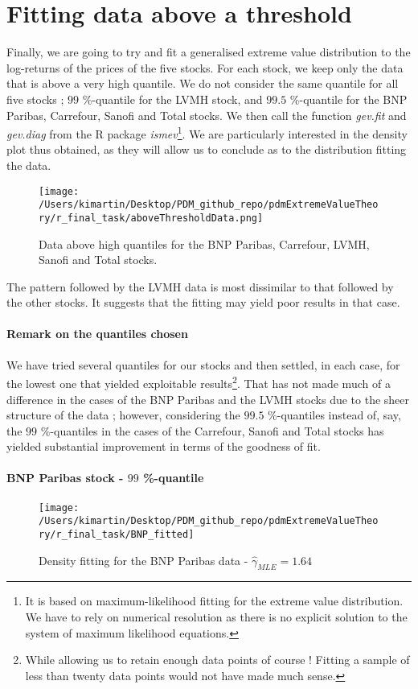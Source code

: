 \section{Fitting data above a threshold}
Finally, we are going to try and fit a generalised extreme value distribution to the log-returns of the prices of the five stocks. For each stock, we keep only the data that is above a very high quantile. We do not consider the same quantile for all five stocks ; $99$ \%-quantile for the LVMH stock, and $99.5$ \%-quantile for the BNP Paribas, Carrefour, Sanofi and Total stocks. We then call the function \textit{gev.fit} and \textit{gev.diag} from the R package \textit{ismev}\footnote{It is based on maximum-likelihood fitting for the extreme value distribution. We have to rely on numerical resolution as there is no explicit solution to the system of maximum likelihood equations.}. We are particularly interested in the density plot thus obtained, as they will allow us to conclude as to the distribution fitting the data.
\begin{figure}[h!]
	\centering
	\texttt{[image: /Users/kimartin/Desktop/PDM\_github\_repo/pdmExtremeValueTheory/r\_final\_task/aboveThresholdData.png]}
	\caption{Data above high quantiles for the BNP Paribas, Carrefour, LVMH, Sanofi and Total stocks.}
	\label{fig:dataAboveThreshold}
\end{figure}
The pattern followed by the LVMH data is most dissimilar to that followed by the other stocks. It suggests that the fitting may yield poor results in that case.
\paragraph{Remark on the quantiles chosen}
We have tried several quantiles for our stocks and then settled, in each case, for the lowest one that yielded exploitable results\footnote{While allowing us to retain enough data points of course ! Fitting a sample of less than twenty data points would not have made much sense.}. That has not made much of a difference in the cases of the BNP Paribas and the LVMH stocks due to the sheer structure of the data ; however, considering the $99.5$ \%-quantiles instead of, say, the $99$ \%-quantiles in the cases of the Carrefour, Sanofi and Total stocks has yielded substantial improvement in terms of the goodness of fit.
\paragraph{BNP Paribas stock - $99$ \%-quantile}
\newline
\begin{figure}[h!]
	\centering
	\texttt{[image: /Users/kimartin/Desktop/PDM\_github\_repo/pdmExtremeValueTheory/r\_final\_task/BNP\_fitted]}
	\caption{Density fitting for the BNP Paribas data - $\hat{\gamma}_{MLE} = 1.64$ \\}
	\label{fig:dataAboveThresholdBNPFitted}
\end{figure}
